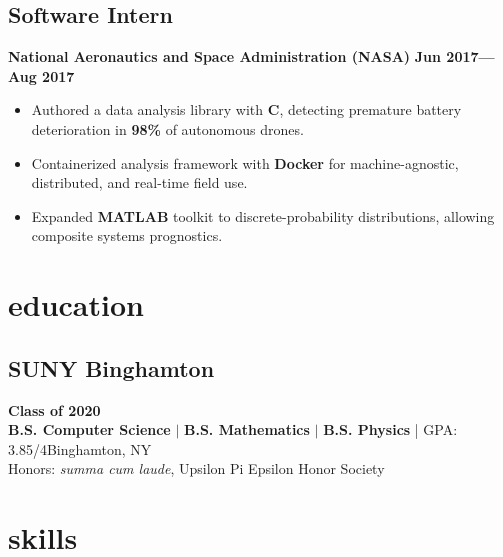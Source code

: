 \documentclass{article}
\newcommand{\subsubsectiontext}[1]{
    \hspace*{.5cm}%
    \begin{minipage}{.9\textwidth}%
    #1
    \end{minipage}%
}
\def\Cplusplus{C\raisebox{0.5ex}{\tiny\textbf{++}}}
\begin{document}
\subsection{Software Intern} \hfill \textbf{National Aeronautics and Space Administration (NASA)} \hfill \textbf{Jun 2017---Aug 2017}
\subsubsectiontext{
    \begin{itemize}[leftmargin=0cm,nosep] 
        \item Authored a data analysis library with \textbf{\Cplusplus}, detecting premature battery deterioration in \textbf{98\%} of autonomous drones.
        \item Containerized analysis framework with \textbf{Docker} for machine-agnostic, distributed, and real-time field use.
        \item Expanded \textbf{MATLAB} toolkit to discrete-probability distributions, allowing composite systems prognostics.
    \end{itemize}
}


















\section{education}

\subsection{SUNY Binghamton} \hfill \textbf{Class of 2020}\\
\textbf{B.S. Computer Science} $\vert$ \textbf{B.S. Mathematics} $\vert$ \textbf{B.S. Physics} | GPA: 3.85/4\hfill Binghamton, NY\\
Honors: \textit{summa cum laude}, Upsilon Pi Epsilon Honor Society














\section{skills}
\end{document}
